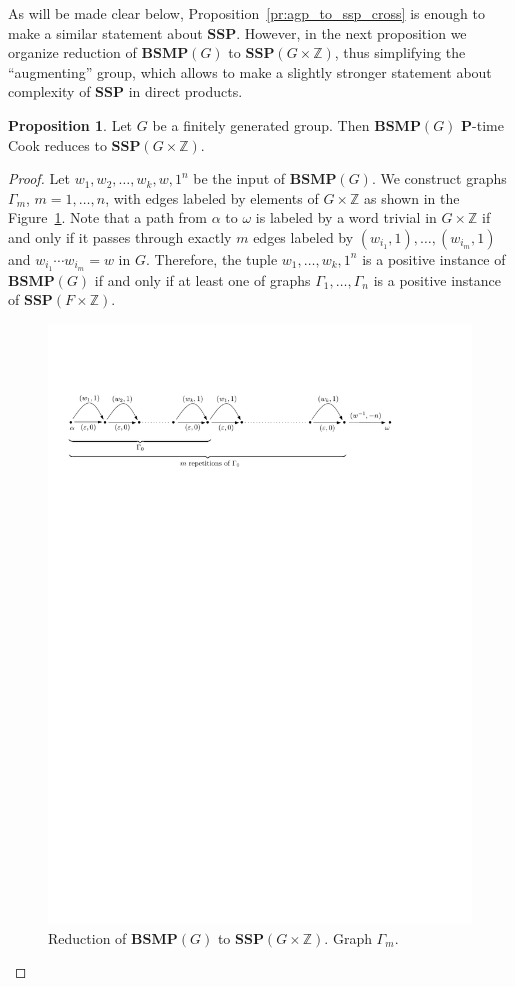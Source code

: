 \documentclass[10pt]{amsart}
\theoremstyle{definition}
\newtheorem{proposition}[theorem]{Proposition}
\def\P{{\mathbf{P}}}
\def\SSP{{\mathbf{SSP}}}
\def\BSMP{{\mathbf{BSMP}}}
\begin{document}
As will be made clear below, Proposition~\ref{pr:agp_to_ssp_cross} is enough to make a similar statement about $\SSP$. However, in the next proposition we organize reduction of $\BSMP(G)$ to $\SSP(G\times \mathbb Z)$, thus simplifying the ``augmenting'' group, which allows to make a slightly stronger statement about complexity of $\SSP$ in direct products.

\begin{proposition}\label{pr:bsmp_to_ssp}
Let $G$ be a finitely generated group. Then $\BSMP(G)$ $\P$-time Cook reduces to $\SSP(G\times \mathbb Z)$.
\end{proposition}
\begin{proof} Let $w_1,w_2,\ldots, w_k, w, 1^n$ be the input of $\BSMP(G)$. We construct graphs $\Gamma_m$, $m=1,\ldots, n$, with edges labeled by elements of $G\times \mathbb Z$ as shown in the Figure~\ref{fi:bsmp_to_ssp}. Note that a path from $\alpha$ to $\omega$ is labeled by a word trivial in $G\times\mathbb Z$ if and only if it passes through exactly $m$ edges labeled by $(w_{i_1},1),\ldots,(w_{i_m},1)$ and $w_{i_1}\cdots w_{i_m}=w$ in $G$. Therefore, the tuple $w_1,\ldots,w_k,1^n$ is a positive instance of $\BSMP(G)$ if and only if at least one of graphs $\Gamma_1,\ldots, \Gamma_n$ is a positive instance of $\SSP(F\times\mathbb Z)$.
\begin{figure}[h]
 \centering
 \includegraphics[width=6in]{bsmp_to_ssp}
 \caption{Reduction of $\BSMP(G)$ to $\SSP(G\times \mathbb Z)$. Graph $\Gamma_m$.} \label{fi:bsmp_to_ssp}
\end{figure}
\end{proof}
\end{document}
